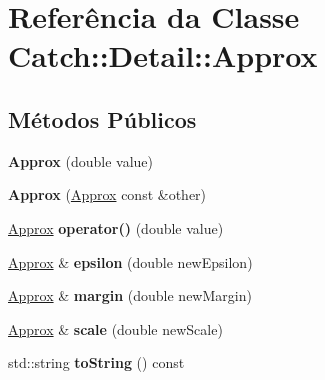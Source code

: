 \hypertarget{classCatch_1_1Detail_1_1Approx}{}\section{Referência da Classe Catch\+:\+:Detail\+:\+:Approx}
\label{classCatch_1_1Detail_1_1Approx}
\subsection*{Métodos Públicos}
\begin{DoxyCompactItemize}
\item 
{\bfseries Approx} (double value)\hypertarget{classCatch_1_1Detail_1_1Approx_a1a8618ea8db08c66bd3d9fe8f74b957a}{}\label{classCatch_1_1Detail_1_1Approx_a1a8618ea8db08c66bd3d9fe8f74b957a}

\item 
{\bfseries Approx} (\hyperlink{classCatch_1_1Detail_1_1Approx}{Approx} const \&other)\hypertarget{classCatch_1_1Detail_1_1Approx_a807330c63266fc914abdf6e461255a54}{}\label{classCatch_1_1Detail_1_1Approx_a807330c63266fc914abdf6e461255a54}

\item 
\hyperlink{classCatch_1_1Detail_1_1Approx}{Approx} {\bfseries operator()} (double value)\hypertarget{classCatch_1_1Detail_1_1Approx_a48c9cbc28a05dc9dc8c3973b9eae2268}{}\label{classCatch_1_1Detail_1_1Approx_a48c9cbc28a05dc9dc8c3973b9eae2268}

\item 
\hyperlink{classCatch_1_1Detail_1_1Approx}{Approx} \& {\bfseries epsilon} (double new\+Epsilon)\hypertarget{classCatch_1_1Detail_1_1Approx_a05c50c3ad0a971fab19345b5d94979a9}{}\label{classCatch_1_1Detail_1_1Approx_a05c50c3ad0a971fab19345b5d94979a9}

\item 
\hyperlink{classCatch_1_1Detail_1_1Approx}{Approx} \& {\bfseries margin} (double new\+Margin)\hypertarget{classCatch_1_1Detail_1_1Approx_a82f7049b41c16e6234275641fad22218}{}\label{classCatch_1_1Detail_1_1Approx_a82f7049b41c16e6234275641fad22218}

\item 
\hyperlink{classCatch_1_1Detail_1_1Approx}{Approx} \& {\bfseries scale} (double new\+Scale)\hypertarget{classCatch_1_1Detail_1_1Approx_acd80f0737bf38112beacd5ca95bef113}{}\label{classCatch_1_1Detail_1_1Approx_acd80f0737bf38112beacd5ca95bef113}

\item 
std\+::string {\bfseries to\+String} () const \hypertarget{classCatch_1_1Detail_1_1Approx_adeb74b73506b3f6b2ba72aea15168fbe}{}\label{classCatch_1_1Detail_1_1Approx_adeb74b73506b3f6b2ba72aea15168fbe}

\end{DoxyCompactItemize}
